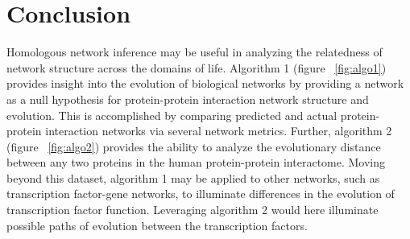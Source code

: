 \documentclass{acmsiggraph}               %
\begin{document}
\section{Conclusion}
\label{sec:conclusion}
Homologous network inference may be useful in analyzing the relatedness of network structure across the domains of life. Algorithm 1 (figure ~\ref{fig:algo1}) provides insight into the evolution of biological networks by providing a network as a null hypothesis for protein-protein interaction network structure and evolution. This is accomplished by comparing predicted and actual protein-protein interaction networks via several network metrics. Further, algorithm 2 (figure ~\ref{fig:algo2}) provides the ability to analyze the evolutionary distance between any two proteins in the human protein-protein interactome. Moving beyond this dataset, algorithm 1 may be applied to other networks, such as transcription factor-gene networks, to illuminate differences in the evolution of transcription factor function. Leveraging algorithm 2 would here illuminate possible paths of evolution between the transcription factors.




\nocite{*}

\end{document}
